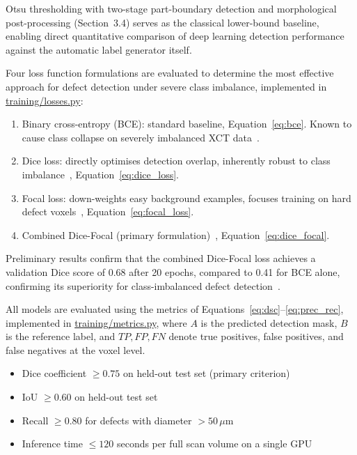 Otsu thresholding with two-stage part-boundary detection and morphological post-processing
(Section~3.4) serves as the classical lower-bound baseline, enabling direct quantitative comparison
of deep learning detection performance against the automatic label generator itself.

Four loss function formulations are evaluated to determine the most effective approach for defect
detection under severe class imbalance, implemented in \url{training/losses.py}:
\begin{enumerate}
\item Binary cross-entropy (BCE): standard baseline, Equation~\eqref{eq:bce}. Known to cause class
  collapse on severely imbalanced XCT data~\citep{Sudre2017}.
\item Dice loss: directly optimises detection overlap, inherently robust to class
  imbalance~\citep{Sudre2017}, Equation~\eqref{eq:dice_loss}.
\item Focal loss: down-weights easy background examples, focuses training on hard defect
  voxels~\citep{Lin2017}, Equation~\eqref{eq:focal_loss}.
\item Combined Dice-Focal (primary formulation)~\citep{Sudre2017,Lin2017},
  Equation~\eqref{eq:dice_focal}.
\end{enumerate}
Preliminary results confirm that the combined Dice-Focal loss achieves a validation Dice score of
0.68 after 20 epochs, compared to 0.41 for BCE alone, confirming its superiority for
class-imbalanced defect detection~\citep{Sudre2017}.

All models are evaluated using the metrics of Equations~\eqref{eq:dsc}--\eqref{eq:prec_rec},
implemented in \url{training/metrics.py}, where $A$ is the predicted detection mask, $B$ is the
reference label, and $TP, FP, FN$ denote true positives, false positives, and false negatives at the
voxel level.

\begin{itemize}
\item Dice coefficient $\geq 0.75$ on held-out test set (primary criterion)
\item IoU $\geq 0.60$ on held-out test set
\item Recall $\geq 0.80$ for defects with diameter $> 50\,\mu$m
\item Inference time $\leq 120$ seconds per full scan volume on a single GPU
\end{itemize}

